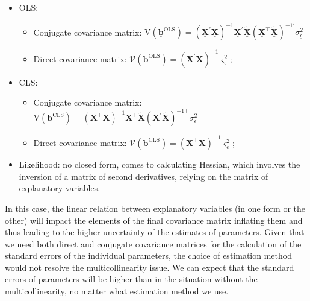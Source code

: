 \documentclass[
]{book}
\providecommand{\tightlist}{%
  \setlength{\itemsep}{0pt}\setlength{\parskip}{0pt}}
\begin{document}
\begin{itemize}
\tightlist
\item
  OLS:

  \begin{itemize}
  \tightlist
  \item
    Conjugate covariance matrix: \(\mathrm{V}\left( \underline{\boldsymbol{b}}^{\text{OLS}} \right) = \left( \underline{\mathbf{X}}^\prime \underline{\mathbf{X}} \right)^{-1} \underline{\mathbf{X}}^\prime \tilde{\underline{\mathbf{X}}} \left( {\underline{\mathbf{X}}}^\top \tilde{\underline{\mathbf{X}}} \right)^{-1 \prime} \sigma_{\underline{\epsilon}}^2\)
  \item
    Direct covariance matrix: \(\mathcal{V}\left( \underline{\boldsymbol{b}}^{\text{OLS}} \right) = \left( \underline{\mathbf{X}}^\prime \underline{\mathbf{X}} \right)^{-1} \varsigma_{\underline{\epsilon}}^2\);
  \end{itemize}
\item
  CLS:

  \begin{itemize}
  \tightlist
  \item
    Conjugate covariance matrix: \(\mathrm{V}\left( \underline{\boldsymbol{b}}^{\text{CLS}} \right) = \left( \underline{\mathbf{X}}^\top \underline{\mathbf{X}} \right)^{-1} \underline{\mathbf{X}}^\top \tilde{\underline{\mathbf{X}}} \left( {\underline{\mathbf{X}}}^\prime \tilde{\underline{\mathbf{X}}} \right)^{-1 \top} \sigma_{\underline{\epsilon}}^2\)
  \item
    Direct covariance matrix: \(\mathcal{V}\left( \underline{\boldsymbol{b}}^{\text{CLS}} \right) = \left( \underline{\mathbf{X}}^\top \underline{\mathbf{X}} \right)^{-1} \varsigma_{\underline{\epsilon}}^2\);
  \end{itemize}
\item
  Likelihood: no closed form, comes to calculating Hessian, which involves the inversion of a matrix of second derivatives, relying on the matrix of explanatory variables.
\end{itemize}

In this case, the linear relation between explanatory variables (in one form or the other) will impact the elements of the final covariance matrix inflating them and thus leading to the higher uncertainty of the estimates of parameters. Given that we need both direct and conjugate covariance matrices for the calculation of the standard errors of the individual parameters, the choice of estimation method would not resolve the multicollinearity issue. We can expect that the standard errors of parameters will be higher than in the situation without the multicollinearity, no matter what estimation method we use.
\end{document}
